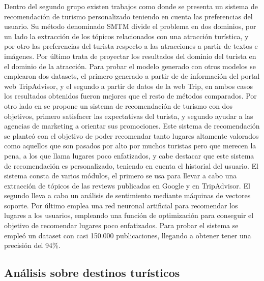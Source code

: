 Dentro del segundo grupo existen trabajos como \cite{8796367} donde se presenta un sistema de recomendación de turismo personalizado teniendo en cuenta las preferencias del usuario. Su método denominado SMTM divide el problema en dos dominios, por un lado la extracción de los tópicos relacionados con una atracción turística, y por otro las preferencias del turista respecto a las atracciones a partir de textos e imágenes. Por último trata de proyectar los resultados del dominio del turista en el dominio de la atracción. Para probar el modelo generado con otros modelos se emplearon dos datasets, el primero generado a partir de de información del portal web TripAdvisor, y el segundo a partir de datos de la web Trip, en ambos casos los resultados obtenidos fueron mejores que el resto de métodos comparados. Por otro lado en \cite{recom_mech_under_emph} se propone un sistema de recomendación de turismo con dos objetivos, primero satisfacer las expectativas del turista, y segundo ayudar a las agencias de marketing a orientar sus promociones. Este sistema de recomendación se planteó con el objetivo de poder recomendar tanto lugares altamente valorados como aquellos que son pasados por alto por muchos turistas pero que merecen la pena, a los que llama lugares poco enfatizados, y cabe destacar que este sistema de recomendación es personalizado, teniendo en cuenta el historial del usuario. El sistema consta de varios módulos, el primero se usa para llevar a cabo una extracción de tópicos de las reviews publicadas en Google y en TripAdvisor. El segundo lleva a cabo un análisis de sentimiento mediante máquinas de vectores soporte. Por último emplea una red neuronal artificial para recomendar los lugares a los usuarios, empleando una función de optimización para conseguir el objetivo de recomendar lugares poco enfatizados. Para probar el sistema se empleó un dataset con casi 150.000 publicaciones, llegando a obtener tener una precisión del 94\%.\\

\subsection{Análisis sobre destinos turísticos}

